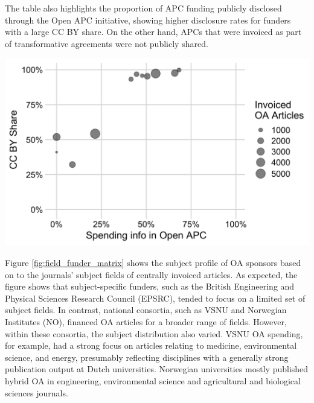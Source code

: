 \documentclass[a4paper,man,floatsintext,longtable,noextraspace,12pt]{apa6}
\begin{document}
The table also highlights the proportion of APC funding publicly
disclosed through the Open APC initiative, showing higher disclosure
rates for funders with a large CC BY share. On the other hand, APCs that
were invoiced as part of transformative agreements were not publicly
shared.

\begin{center}\includegraphics[width=0.7\linewidth,]{manuscript_files/figure-latex/ccby_vs_openapc-1} \end{center}

Figure \ref{fig:field_funder_matrix} shows the subject profile of OA
sponsors based on to the journals' subject fields of centrally invoiced
articles. As expected, the figure shows that subject-specific funders,
such as the British Engineering and Physical Sciences Research Council
(EPSRC), tended to focus on a limited set of subject fields. In
contrast, national consortia, such as VSNU and Norwegian Institutes
(NO), financed OA articles for a broader range of fields. However,
within these consortia, the subject distribution also varied. VSNU OA
spending, for example, had a strong focus on articles relating to
medicine, environmental science, and energy, presumably reflecting
disciplines with a generally strong publication output at Dutch
universities. Norwegian universities mostly published hybrid OA in
engineering, environmental science and agricultural and biological
sciences journals.
\end{document}
